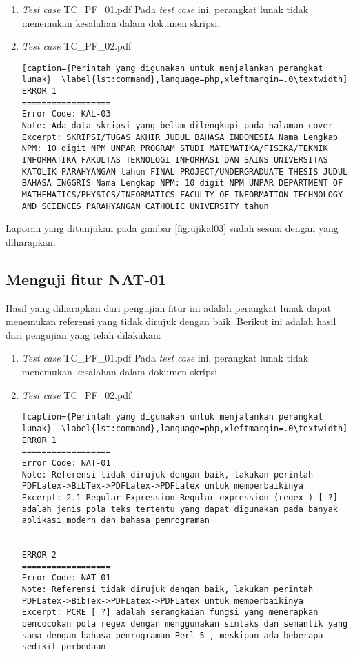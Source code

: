 \begin{enumerate}
	\item \textit{Test case} TC\_PF\_01.pdf
	Pada \textit{test case} ini, perangkat lunak tidak menemukan kesalahan dalam dokumen skripsi.
	
	\item \textit{Test case} TC\_PF\_02.pdf
	
\begin{lstlisting}[caption={Perintah yang digunakan untuk menjalankan perangkat lunak}	\label{lst:command},language=php,xleftmargin=.0\textwidth]
ERROR 1
==================
Error Code: KAL-03
Note: Ada data skripsi yang belum dilengkapi pada halaman cover
Excerpt: SKRIPSI/TUGAS AKHIR JUDUL BAHASA INDONESIA Nama Lengkap NPM: 10 digit NPM UNPAR PROGRAM STUDI MATEMATIKA/FISIKA/TEKNIK INFORMATIKA FAKULTAS TEKNOLOGI INFORMASI DAN SAINS UNIVERSITAS KATOLIK PARAHYANGAN tahun FINAL PROJECT/UNDERGRADUATE THESIS JUDUL BAHASA INGGRIS Nama Lengkap NPM: 10 digit NPM UNPAR DEPARTMENT OF MATHEMATICS/PHYSICS/INFORMATICS FACULTY OF INFORMATION TECHNOLOGY AND SCIENCES PARAHYANGAN CATHOLIC UNIVERSITY tahun 
\end{lstlisting}
\end{enumerate}

Laporan yang ditunjukan pada gambar \ref{fig:ujikal03} sudah sesuai dengan yang diharapkan.

\subsection{Menguji fitur NAT-01}
Hasil yang diharapkan dari pengujian fitur ini adalah perangkat lunak dapat menemukan referensi yang tidak dirujuk dengan baik. Berikut ini adalah hasil dari pengujian yang telah dilakukan:

\begin{enumerate}
	\item \textit{Test case} TC\_PF\_01.pdf
	Pada \textit{test case} ini, perangkat lunak tidak menemukan kesalahan dalam dokumen skripsi.
	
	\item \textit{Test case} TC\_PF\_02.pdf
	
\begin{lstlisting}[caption={Perintah yang digunakan untuk menjalankan perangkat lunak}	\label{lst:command},language=php,xleftmargin=.0\textwidth]
ERROR 1
==================
Error Code: NAT-01
Note: Referensi tidak dirujuk dengan baik, lakukan perintah PDFLatex->BibTex->PDFLatex->PDFLatex untuk memperbaikinya
Excerpt: 2.1 Regular Expression Regular expression (regex ) [ ?] adalah jenis pola teks tertentu yang dapat digunakan pada banyak aplikasi modern dan bahasa pemrograman


ERROR 2
==================
Error Code: NAT-01
Note: Referensi tidak dirujuk dengan baik, lakukan perintah PDFLatex->BibTex->PDFLatex->PDFLatex untuk memperbaikinya
Excerpt: PCRE [ ?] adalah serangkaian fungsi yang menerapkan pencocokan pola regex dengan menggunakan sintaks dan semantik yang sama dengan bahasa pemrograman Perl 5 , meskipun ada beberapa sedikit perbedaan
\end{lstlisting}
\end{enumerate}


